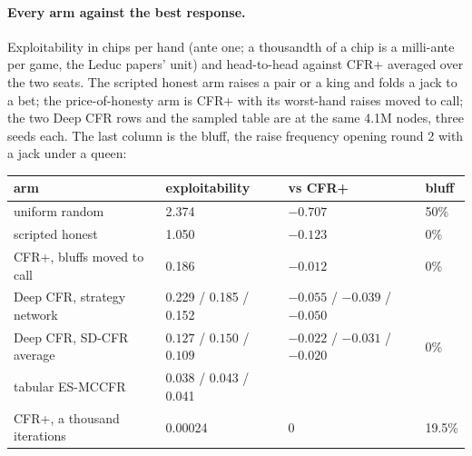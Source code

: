 \paragraph{Every arm against the best response.} Exploitability in chips per hand (ante
one; a thousandth of a chip is a milli-ante per game, the Leduc papers' unit) and
head-to-head against CFR+ averaged over the two seats. The scripted honest arm raises a
pair or a king and folds a jack to a bet; the price-of-honesty arm is CFR+ with its
worst-hand raises moved to call; the two Deep CFR rows and the sampled table are at the
same 4.1M nodes, three seeds each. The last column is the bluff, the raise frequency
opening round 2 with a jack under a queen:

\begin{center}
\small
\begin{tabular}{@{}l l l l@{}}
\hline
arm & exploitability & vs CFR+ & bluff \\
\hline
uniform random              & 2.374 & $-0.707$ & 50\% \\
scripted honest             & 1.050 & $-0.123$ & 0\% \\
CFR+, bluffs moved to call  & 0.186 & $-0.012$ & 0\% \\
Deep CFR, strategy network  & 0.229 / 0.185 / 0.152 & $-0.055$ / $-0.039$ / $-0.050$ & \\
Deep CFR, SD-CFR average    & $\mathbf{0.127}$ / $\mathbf{0.150}$ / $\mathbf{0.109}$ & $-0.022$ / $-0.031$ / $-0.020$ & 0\% \\
tabular ES-MCCFR            & 0.038 / 0.043 / 0.041 & & \\
CFR+, a thousand iterations & 0.00024 & 0 & 19.5\% \\
\hline
\end{tabular}
\end{center}

